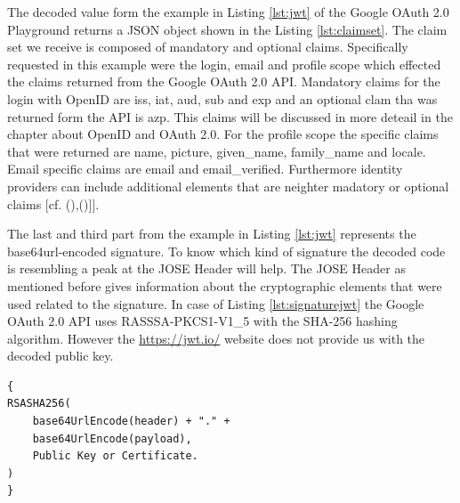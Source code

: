 The decoded value form the example in Listing \ref{lst:jwt} of the Google OAuth 2.0 Playground \cite{Google:2018:OAuthPlayground} returns a JSON object shown in the Listing \ref{lst:claimset}. The claim set we receive is composed of mandatory and optional claims. Specifically requested in this example were the login, email and profile scope which effected the claims returned from the Google OAuth 2.0 API. Mandatory claims for the login with OpenID are iss, iat, aud, sub and exp and an optional clam tha was returned form the API is azp. This claims will be discussed in more deteail in the chapter about OpenID and OAuth 2.0. For the profile scope the specific claims that were returned are name, picture, given\_name, family\_name and locale. Email specific claims are email and email\_verified. Furthermore identity providers can include additional elements that are neighter madatory or optional claims [cf. ({\cite{Google:2018:OAuthPlayground}),(\cite{Siriwardena:JWTJWSJWE:2016})]}].

The last and third part from the example in  Listing \ref{lst:jwt}  represents the base64url-encoded signature. To know which kind of signature the decoded code is resembling a peak at the JOSE Header will help. The JOSE Header as mentioned before gives information about the cryptographic elements that were used related to the signature. In case of Listing \ref{lst:signaturejwt} the Google OAuth 2.0 API uses RASSSA-PKCS1-V1\_5 with the SHA-256 hashing algorithm. However the \href{https://jwt.io/} {https://jwt.io/} website does not provide us with the decoded public key. 

\begin{lstlisting}
{
RSASHA256(
	base64UrlEncode(header) + "." +
	base64UrlEncode(payload),
	Public Key or Certificate.
)
}
\end{lstlisting}


